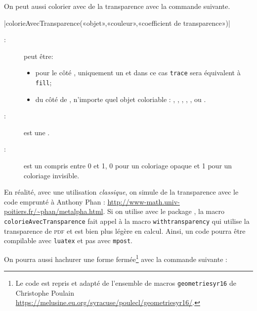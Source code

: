 \documentclass[a4paper,french]{article}
\begin{document}
On peut aussi colorier avec de la transparence avec la commande
suivante.
\begin{colourband}
\macro|colorieAvecTransparence(«objet»,«couleur»,«coefficient de transparence»)|
\begin{description}
  \item[:] peut être:
  \begin{itemize}
    \item pour le côté \MP, uniquement un  et dans ce cas \lstinline+trace+ sera équivalent à \lstinline+fill+;
    \item du côté de \mpgeomdd,
  n'importe quel objet coloriable : ,
   , , , , ou
  .
  \end{itemize}
  \item[:] est une .
  \item[:] est un  compris
  entre 0 et 1, 0 pour un coloriage opaque et 1 pour un coloriage invisible.
\end{description}
\end{colourband}

En réalité, avec une utilisation \emph{classique}, on simule de
la transparence avec le code emprunté à Anthony Phan :
\url{http://www-math.univ-poitiers.fr/~phan/metalpha.html}. Si on utilise
\mpgeomdd avec le package , la macro
\lstinline+colorieAvecTransparence+ fait appel à la macro
\lstinline+withtransparency+ qui utilise la transparence de \textsc{pdf} et est
bien plus légère en calcul. Ainsi, un code pourra être compilable avec
\texttt{luatex} et pas avec \texttt{mpost}.


On pourra aussi hachurer une forme fermée\footnote{Le code est repris et adapté
de l’ensemble de macros \texttt{geometriesyr16} de Christophe Poulain \url{https://melusine.eu.org/syracuse/poulecl/geometriesyr16/}.} avec la
commande suivante : 
\end{document}
